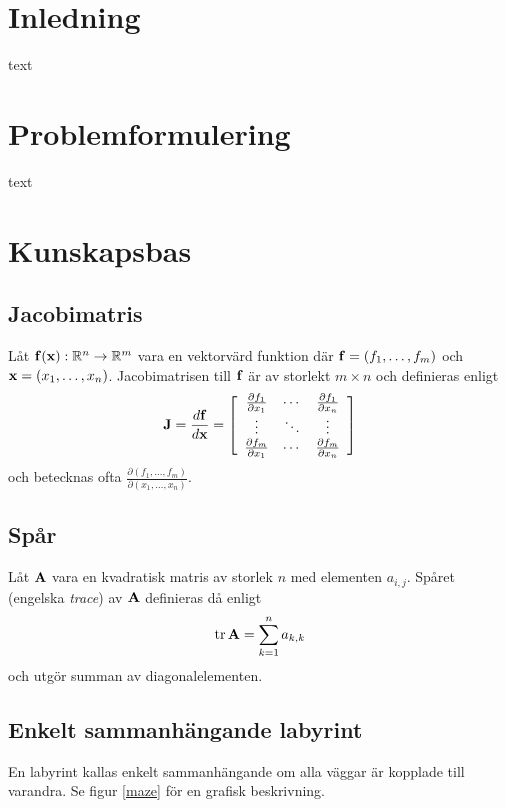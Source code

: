 \documentclass[11pt]{article}
\newcommand{\bfr}[1]{\textbf{\textrm{{#1}}}}
\begin{document}
\begin{flushleft}

\section{Inledning}
text \cite{893287}

\section{Problemformulering}
text

\pagebreak
\section{Kunskapsbas}
\subsection{Jacobimatris}
Låt $\bfr{f}(\bfr{x}):\mathbb{R}^{n}\rightarrow\mathbb{R}^{m}$ vara en vektorvärd funktion där $\bfr{f}=\left(f_1,\ldots,f_m\right)$ och $\bfr{x}=\left(x_1,\ldots,x_n\right)$. Jacobimatrisen till $\bfr{f}$ är av storlekt $m\times n$ och definieras enligt
\begin{equation*}
	\bfr{J} = \frac{d\bfr{f}}{d\bfr{x}} = \left[ \begin{array}{ccc}
		\frac{\partial f_1}{\partial x_1} & \cdots & \frac{\partial f_1}{\partial x_n} \\
		\vdots & \ddots & \vdots \\
		\frac{\partial f_m}{\partial x_1} & \cdots & \frac{\partial f_m}{\partial x_n}
	\end{array} \right]
\end{equation*}
och betecknas ofta $\frac{\partial \left(f_1,\ldots,f_m\right)}{\partial \left(x_1,\ldots,x_n \right)}$.

\subsection{Spår}
Låt $\bfr{A}$ vara en kvadratisk matris av storlek $n$ med elementen $a_{i,j}$. Spåret (engelska \emph{trace}) av $\bfr{A}$ definieras då enligt
\begin{equation*}
	\mathrm{tr}\,\bfr{A} = \sum_{k=1}^{n} a_{k,k}
\end{equation*}
och utgör summan av diagonalelementen.

\subsection{Enkelt sammanhängande labyrint}
En labyrint kallas enkelt sammanhängande om alla väggar är kopplade till varandra. Se figur \ref{maze} för en grafisk beskrivning.


\end{flushleft}
\end{document}
